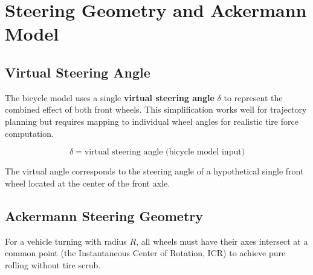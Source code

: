 \documentclass[11pt,a4paper]{article}
\begin{document}
\section{Steering Geometry and Ackermann Model}
\label{sec:steering}

\subsection{Virtual Steering Angle}

The bicycle model uses a single \textbf{virtual steering angle} $\delta$ to represent the combined effect of both front wheels. This simplification works well for trajectory planning but requires mapping to individual wheel angles for realistic tire force computation.

\begin{equation}
\delta = \text{virtual steering angle (bicycle model input)}
\end{equation}

The virtual angle corresponds to the steering angle of a hypothetical single front wheel located at the center of the front axle.

\subsection{Ackermann Steering Geometry}

For a vehicle turning with radius $R$, all wheels must have their axes intersect at a common point (the Instantaneous Center of Rotation, ICR) to achieve pure rolling without tire scrub.
\end{document}

